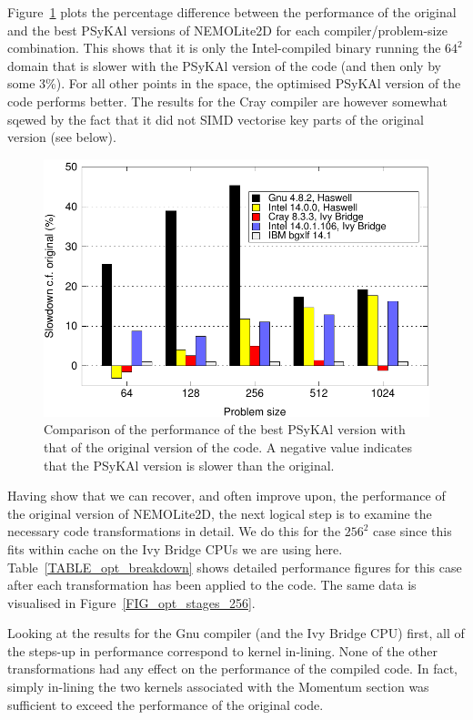 \documentclass[gmd, manuscript]{copernicus}
\newlength{\picwidth}
\begin{document}
Figure~\ref{FIG_slowdown_summary} plots the percentage difference
between the performance of the original and the best {PS}y{KA}l versions
of NEMOLite2D for each compiler/problem-size combination. This shows that it is
only the Intel-compiled binary running the $64^2$ domain that is
slower with the {PS}y{KA}l version of the code (and then only by some
3\%). For all other points in the space, the optimised {PS}y{KA}l version
of the code performs better. The results for the Cray compiler are
however somewhat sqewed by the fact that it did not SIMD vectorise key
parts of the original version (see below).

\begin{figure}[!t]
\centering
\includegraphics[width=\picwidth]{slowdown_summary}
\caption{Comparison of the performance of the best {PS}y{KA}l
version with that of the original version of the code. A negative value 
indicates that the {PS}y{KA}l version is slower than the original.}
\label{FIG_slowdown_summary}
\end{figure}

Having show that we can recover, and often improve upon, the
performance of the original version of NEMOLite2D, the next logical
step is to examine the necessary code transformations in detail.  We
do this for the $256^{2}$ case since this fits within cache on the Ivy
Bridge CPUs we are using here.  Table~\ref{TABLE_opt_breakdown} shows
detailed performance figures for this case after each transformation
has been applied to the code. The same data is visualised in
Figure~\ref{FIG_opt_stages_256}.

Looking at the results for the Gnu compiler (and the Ivy Bridge CPU)
first, all of the steps-up in performance correspond to kernel
in-lining. None of the other transformations had any effect on the
performance of the compiled code. In fact, simply in-lining the two
kernels associated with the Momentum section was sufficient to exceed
the performance of the original code.
\end{document}
